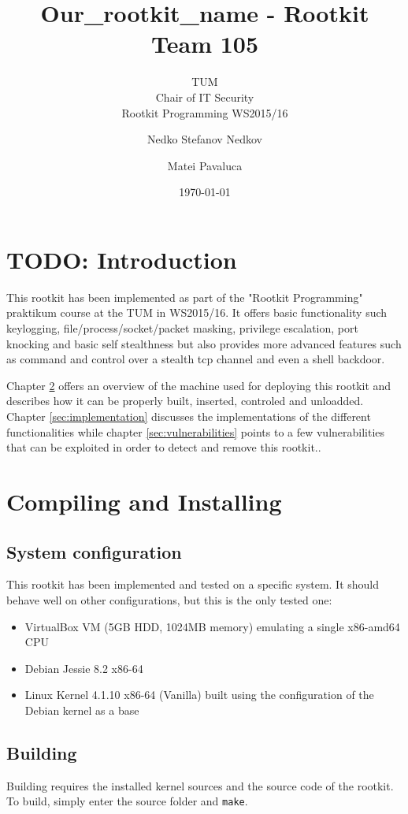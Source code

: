 \documentclass[10pt, letterpaper]{scrartcl}
\title{Our\_rootkit\_name - Rootkit Team 105}
\subtitle{TUM \\Chair of IT Security\\  Rootkit Programming WS2015/16}
\author{Nedko Stefanov Nedkov \and Matei Pavaluca}
\date{\today}
\begin{document}
\maketitle
\tableofcontents
\newpage

\section{TODO: Introduction}
This rootkit has been implemented as part of the "Rootkit Programming" praktikum
course at the TUM in WS2015/16. It offers basic functionality such keylogging,
file/process/socket/packet masking, privilege escalation, port knocking and basic self stealthness but also provides more
advanced features such as command and control over a stealth tcp channel and
even a shell backdoor.

Chapter \ref{sec:compiling_and_installing} offers an overview of the machine
used for deploying this rootkit and describes how it can be properly built,
inserted, controled and unloadded.
Chapter \ref{sec:implementation} discusses the implementations of the different
functionalities while chapter \ref{sec:vulnerabilities} points to a few
vulnerabilities that can be exploited in order to detect and remove this
rootkit..

\section{Compiling and Installing}\label{sec:compiling_and_installing}
\subsection{System configuration}
This rootkit has been implemented and tested on a specific system. It should
behave well on other configurations, but this is the only tested one:
\begin{itemize}
    \item VirtualBox VM (5GB HDD, 1024MB memory) emulating a single x86-amd64 CPU
    \item Debian Jessie 8.2 x86-64
    \item Linux Kernel 4.1.10 x86-64 (Vanilla) built using the configuration of the Debian kernel as a base
\end{itemize}

\subsection{Building}
Building requires the installed kernel sources and the source code of the
rootkit. To build, simply enter the source folder and \texttt{make}.
\end{document}
